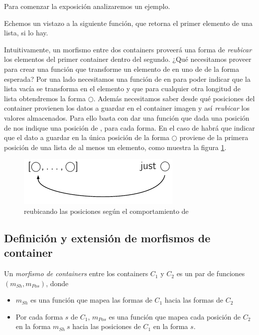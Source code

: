 Para comenzar la exposición analizaremos un ejemplo.
\begin{example}\label{ex:head}
Echemos un vistazo a la siguiente función, que retorna el primer elemento de una lista, si lo hay.


Intuitivamente, un morfismo entre dos containers proveerá una forma de {\it reubicar} los elementos del primer container dentro del segundo.
¿Qué necesitamos proveer para crear una función  que transforme un elemento de  en uno de  de la forma esperada?
Por una lado necesitamos una función de \Sh {} en \Sh {} para poder indicar que la lista vacía se transforma en el elemento  y que para cualquier otra longitud de lista obtendremos la forma  $\bigcirc$.  
Además necesitamos saber desde qué posiciones del container  provienen los datos a guardar en el container imagen y así {\it reubicar} los valores almacenados. Para ello basta con dar una función que dada una posición de  nos indique una posición de , para cada forma.
En el caso de  habrá que indicar que el dato a guardar en la única posición de la forma  $\bigcirc$ proviene de la primera posición de una lista de al menos un elemento, como muestra la figura \ref{fig:morph}.

\begin{figure}[H]
\begin{center}
  \includegraphics{img/morfismo2.pdf}
\end{center}
\caption{reubicando las posiciones según el comportamiento de }
\label{fig:morph}
\end{figure}
\end{example}


\subsection{Definición y extensión de morfismos de container}

\begin{definition}
  Un {\it morfismo de containers} entre los containers $C_1$ y $C_2$ es un par de funciones $(m_{Sh}, m_{Pos})$, donde
  \begin{itemize}
    \item $m_{Sh}$ es una función que mapea las formas de $C_1$ hacia las formas de $C_2$
    \item Por cada forma $s$ de $C_1$, $m_{Pos}$ es una función que mapea cada posición de $C_2$ en la forma $m_{Sh}\ s$ hacia las posiciones de $C_1$ en la forma $s$.
  \end{itemize}
\end{definition}

